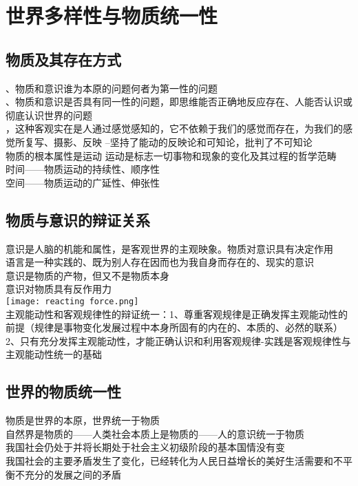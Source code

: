 \documentclass{article}
\begin{document}
	\section{\kaishu 世界多样性与物质统一性}
		\subsection{\kaishu 物质及其存在方式}
			{、物质和意识谁为本原的问题何者为第一性的问题}\\
			{、物质和意识是否具有同一性的问题，即思维能否正确地反应存在、人能否认识或彻底认识世界的问题 }\\
			{，这种客观实在是人通过感觉感知的，它不依赖于我们的感觉而存在，为我们的感觉所复写、摄影、反映 }--{ 坚持了能动的反映论和可知论，批判了不可知论}\\
			{\kaishu 物质的根本属性是运动 运动是标志一切事物和现象的变化及其过程的哲学范畴}\\
			{\kaishu 时间——物质运动的持续性、顺序性}\\
			{\kaishu 空间——物质运动的广延性、伸张性}
		\subsection{\kaishu 物质与意识的辩证关系}
			{\kaishu 意识是人脑的机能和属性，是客观世界的主观映象。物质对意识具有决定作用}\\
			{\kaishu 语言是一种实践的、既为别人存在因而也为我自身而存在的、现实的意识}\\
			{\kaishu 意识是物质的产物，但又不是物质本身}\\
			{\kaishu 意识对物质具有反作用力}\\
			\texttt{[image: reacting force.png]}\\
			{\kaishu 主观能动性和客观规律性的辩证统一：1、尊重客观规律是正确发挥主观能动性的前提（规律是事物变化发展过程中本身所固有的内在的、本质的、必然的联系）2、只有充分发挥主观能动性，才能正确认识和利用客观规律-实践是客观规律性与主观能动性统一的基础}\\
		\subsection{\kaishu 世界的物质统一性}
			{\kaishu 物质是世界的本原，世界统一于物质}\\
			{\kaishu 自然界是物质的——人类社会本质上是物质的——人的意识统一于物质}\\
			{\kaishu 我国社会仍处于并将长期处于社会主义初级阶段的基本国情没有变}\\
			{\kaishu 我国社会的主要矛盾发生了变化，已经转化为人民日益增长的美好生活需要和不平衡不充分的发展之间的矛盾}
\end{document}
